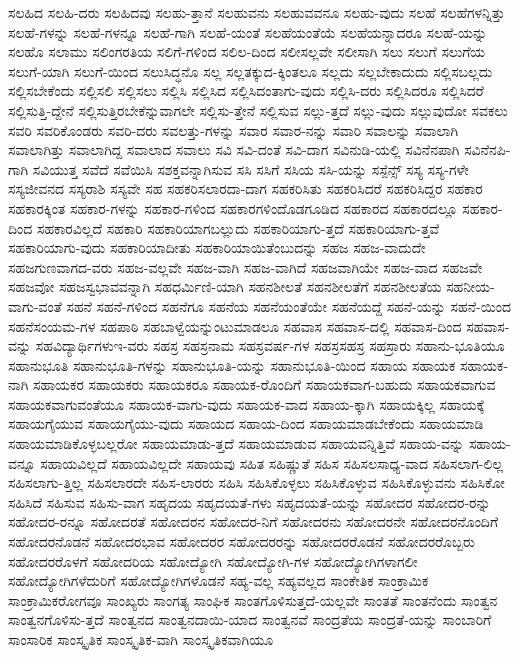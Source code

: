 {ಸಲಹಿದ
ಸಲಹಿ-ದರು
ಸಲಹಿದವು
ಸಲಹು-ತ್ತಾನೆ
ಸಲಹುವನು
ಸಲಹುವವನೂ
ಸಲಹು-ವುದು
ಸಲಹೆ
ಸಲಹೆಗಳನ್ನಿತ್ತು
ಸಲಹೆ-ಗಳನ್ನು
ಸಲಹೆ-ಗಳನ್ನೂ
ಸಲಹೆ-ಗಾಗಿ
ಸಲಹೆ-ಯಂತೆ
ಸಲಹೆಯಂತೆಯೆ
ಸಲಹೆಯನ್ನಾದರೂ
ಸಲಹೆ-ಯನ್ನು
ಸಲಹೊ
ಸಲಾಮು
ಸಲಿಂಗರತಿಯ
ಸಲಿಗೆ-ಗಳಿಂದ
ಸಲಿಲ-ದಿಂದ
ಸಲೀಸಲ್ಲವೇ
ಸಲೀಸಾಗಿ
ಸಲು
ಸಲುಗೆ
ಸಲುಗೆಯ
ಸಲುಗೆ-ಯಾಗಿ
ಸಲುಗೆ-ಯಿಂದ
ಸಲುಸಿದ್ಧನೊ
ಸಲ್ಲ
ಸಲ್ಲತಕ್ಕುದ-ಕ್ಕಿಂತಲೂ
ಸಲ್ಲದು
ಸಲ್ಲಬೇಕಾದುದು
ಸಲ್ಲಿಸಬಲ್ಲದು
ಸಲ್ಲಿಸಬೇಕೆಂದು
ಸಲ್ಲಿಸಲಿ
ಸಲ್ಲಿಸಲು
ಸಲ್ಲಿಸಿ
ಸಲ್ಲಿಸಿದ
ಸಲ್ಲಿಸಿದಂತಾಗು-ವುದು
ಸಲ್ಲಿಸಿ-ದರು
ಸಲ್ಲಿಸಿದರೂ
ಸಲ್ಲಿಸಿದರೆ
ಸಲ್ಲಿಸುತ್ತಿ-ದ್ದೇನೆ
ಸಲ್ಲಿಸುತ್ತಿರಬೇಕೆನ್ನುವಾಗಲೇ
ಸಲ್ಲಿಸು-ತ್ತೇನೆ
ಸಲ್ಲಿಸುವ
ಸಲ್ಲು-ತ್ತದೆ
ಸಲ್ಲು-ವುದು
ಸಲ್ಲುವುದೋ
ಸವಕಲು
ಸವರಿ
ಸವರಿಕೊಂಡರು
ಸವರಿ-ದರು
ಸವಲತ್ತು-ಗಳನ್ನು
ಸವಾರ
ಸವಾರ-ನನ್ನು
ಸವಾರಿ
ಸವಾಲನ್ನು
ಸವಾಲಾಗಿ
ಸವಾಲಾಗಿತ್ತು
ಸವಾಲಾಗಿದ್ದ
ಸವಾಲಾದ
ಸವಾಲು
ಸವಿ
ಸವಿ-ದಂತೆ
ಸವಿ-ದಾಗ
ಸವಿನುಡಿ-ಯಲ್ಲಿ
ಸವಿನೆನಪಾಗಿ
ಸವಿನೆನಪಿ-ಗಾಗಿ
ಸವಿಯುತ್ತ
ಸವೆದೆ
ಸವೆಯಿಸಿ
ಸಶಕ್ತವನ್ನಾಗಿಸುವ
ಸಸಿ
ಸಸಿಗೆ
ಸಸಿಯ
ಸಸಿ-ಯನ್ನು
ಸಸ್ಪೆನ್ಸ್
ಸಸ್ಯ
ಸಸ್ಯ-ಗಳೇ
ಸಸ್ಯಜೀವನದ
ಸಸ್ಯರಾಶಿ
ಸಸ್ಯವೇ
ಸಹ
ಸಹಕರಿಸಲಾರದಾ-ದಾಗ
ಸಹಕರಿಸಿತು
ಸಹಕರಿಸಿದರೆ
ಸಹಕರಿಸಿದ್ದರ
ಸಹಕಾರ
ಸಹಕಾರಕ್ಕಿಂತ
ಸಹಕಾರ-ಗಳನ್ನು
ಸಹಕಾರ-ಗಳಿಂದ
ಸಹಕಾರಗಳಿಂದೊಡಗೂಡಿದ
ಸಹಕಾರದ
ಸಹಕಾರದಲ್ಲೂ
ಸಹಕಾರ-ದಿಂದ
ಸಹಕಾರವಿಲ್ಲದೆ
ಸಹಕಾರಿ
ಸಹಕಾರಿಯಾಗಬಲ್ಲುದು
ಸಹಕಾರಿಯಾಗು-ತ್ತದೆ
ಸಹಕಾರಿಯಾಗು-ತ್ತವೆ
ಸಹಕಾರಿಯಾಗು-ವುದು
ಸಹಕಾರಿಯಾದೀತು
ಸಹಕಾರಿಯಾಯಿತೆಂಬುದನ್ನು
ಸಹಜ
ಸಹಜ-ವಾದುದೇ
ಸಹಜಗುಣವಾಗದ-ವರು
ಸಹಜ-ವಲ್ಲವೇ
ಸಹಜ-ವಾಗಿ
ಸಹಜ-ವಾಗಿದೆ
ಸಹಜವಾಗಿಯೇ
ಸಹಜ-ವಾದ
ಸಹಜವೇ
ಸಹಜವೋ
ಸಹಜಸ್ವಭಾವವನ್ನಾಗಿ
ಸಹಧರ್ಮಿಣಿ-ಯಾಗಿ
ಸಹನಶೀಲತೆ
ಸಹನಶೀಲತೆಗೆ
ಸಹನಶೀಲತೆಯ
ಸಹನೀಯ-ವಾಗು-ವಂತೆ
ಸಹನೆ
ಸಹನೆ-ಗಳಿಂದ
ಸಹನೆಗೂ
ಸಹನೆಯ
ಸಹನೆಯಂತೆಯೇ
ಸಹನೆಯದ್ದೆ
ಸಹನೆ-ಯನ್ನು
ಸಹನೆ-ಯಿಂದ
ಸಹನೆಸಂಯಮ-ಗಳ
ಸಹಪಾಠಿ
ಸಹಬಾಳ್ವೆಯನ್ನುಂಟುಮಾಡಲೂ
ಸಹವಾಸ
ಸಹವಾಸ-ದಲ್ಲಿ
ಸಹವಾಸ-ದಿಂದ
ಸಹವಾಸ-ವನ್ನು
ಸಹವಿದ್ಯಾರ್ಥಿಗಳುಇ-ವರು
ಸಹಸ್ರ
ಸಹಸ್ರನಾಮ
ಸಹಸ್ರವರ್ಷ-ಗಳ
ಸಹಸ್ರಸಹಸ್ರ
ಸಹಸ್ರಾರು
ಸಹಾನು-ಭೂತಿಯೂ
ಸಹಾನುಭೂತಿ
ಸಹಾನುಭೂತಿ-ಗಳನ್ನು
ಸಹಾನುಭೂತಿ-ಯನ್ನು
ಸಹಾನುಭೂತಿ-ಯಿಂದ
ಸಹಾಯ
ಸಹಾಯಕ
ಸಹಾಯಕ-ನಾಗಿ
ಸಹಾಯಕರ
ಸಹಾಯಕರು
ಸಹಾಯಕರೂ
ಸಹಾಯಕ-ರೊಂದಿಗೆ
ಸಹಾಯಕವಾಗ-ಬಹುದು
ಸಹಾಯಕವಾಗುವ
ಸಹಾಯಕವಾಗುವಂತೆಯೂ
ಸಹಾಯಕ-ವಾಗು-ವುದು
ಸಹಾಯಕ-ವಾದ
ಸಹಾಯ-ಕ್ಕಾಗಿ
ಸಹಾಯಕ್ಕಿಲ್ಲ
ಸಹಾಯಕ್ಕೆ
ಸಹಾಯಗೈಯುವ
ಸಹಾಯಗೈಯು-ವುದು
ಸಹಾಯದ
ಸಹಾಯ-ದಿಂದ
ಸಹಾಯಮಾಡಬೇಕೆಂದು
ಸಹಾಯಮಾಡಿ
ಸಹಾಯಮಾಡಿಕೊಳ್ಳಬಲ್ಲರೋ
ಸಹಾಯಮಾಡು-ತ್ತದೆ
ಸಹಾಯಮಾಡುವ
ಸಹಾಯವನ್ನಿತ್ತಿವೆ
ಸಹಾಯ-ವನ್ನು
ಸಹಾಯ-ವನ್ನೂ
ಸಹಾಯವಿಲ್ಲದೆ
ಸಹಾಯವಿಲ್ಲದೇ
ಸಹಾಯವು
ಸಹಿತ
ಸಹಿಷ್ಣುತೆ
ಸಹಿಸ
ಸಹಿಸಲಸಾಧ್ಯ-ವಾದ
ಸಹಿಸಲಾಗ-ಲಿಲ್ಲ
ಸಹಿಸಲಾಗು-ತ್ತಿಲ್ಲ
ಸಹಿಸಲಾರದೇ
ಸಹಿಸ-ಲಾರರು
ಸಹಿಸಿ
ಸಹಿಸಿಕೊಳ್ಳಲು
ಸಹಿಸಿಕೊಳ್ಳುವ
ಸಹಿಸಿಕೊಳ್ಳುವನು
ಸಹಿಸಿಕೋ
ಸಹಿಸಿದೆ
ಸಹಿಸುವ
ಸಹಿಸು-ವಾಗ
ಸಹೃದಯ
ಸಹೃದಯತೆ-ಗಳು
ಸಹೃದಯತೆ-ಯನ್ನು
ಸಹೋದರ
ಸಹೋದರ-ರನ್ನು
ಸಹೋದರ-ರನ್ನೂ
ಸಹೋದರತೆ
ಸಹೋದರನ
ಸಹೋದರ-ನಿಗೆ
ಸಹೋದರನು
ಸಹೋದರನೇ
ಸಹೋದರನೊಂದಿಗೆ
ಸಹೋದರನೊಡನೆ
ಸಹೋದರಭಾವ
ಸಹೋದರರ
ಸಹೋದರರನ್ನು
ಸಹೋದರರೊಡನೆ
ಸಹೋದರರೊಬ್ಬರು
ಸಹೋದರರೊಳಗೆ
ಸಹೋದರಿಯ
ಸಹೋದ್ಯೋಗಿ
ಸಹೋದ್ಯೋಗಿ-ಗಳ
ಸಹೋದ್ಯೋಗಿಗಳಾಗಲೀ
ಸಹೋದ್ಯೋಗಿಗಳೆದುರಿಗೆ
ಸಹೋದ್ಯೋಗಿಗಳೊಡನೆ
ಸಹ್ಯ-ವಲ್ಲ
ಸಹ್ಯವಲ್ಲದ
ಸಾಂಕೇತಿಕ
ಸಾಂಕ್ರಾಮಿಕ
ಸಾಂಕ್ರಾಮಿಕರೋಗವೂ
ಸಾಂಖ್ಯರು
ಸಾಂಗತ್ಯ
ಸಾಂಘಿಕ
ಸಾಂತಗೊಳಿಸುತ್ತದೆ-ಯಲ್ಲವೇ
ಸಾಂತತೆ
ಸಾಂತನೆಂದು
ಸಾಂತ್ವನ
ಸಾಂತ್ವನಗೊಳಿಸು-ತ್ತದೆ
ಸಾಂತ್ವನದ
ಸಾಂತ್ವನದಾಯಿ-ಯಾದ
ಸಾಂತ್ವನವೆ
ಸಾಂದ್ರತೆಯ
ಸಾಂದ್ರತೆ-ಯನ್ನು
ಸಾಂಬಾರಿಗೆ
ಸಾಂಸಾರಿಕ
ಸಾಂಸ್ಕೃತಿಕ
ಸಾಂಸ್ಕೃತಿಕ-ವಾಗಿ
ಸಾಂಸ್ಕೃತಿಕವಾಗಿಯೂ
}
